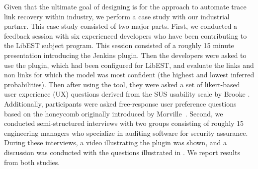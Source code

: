 Given that the ultimate goal of designing \Comet is for the approach to automate trace link recovery within industry, we perform a case study with our industrial partner. This case study consisted of two major parts.
First, we conducted a feedback session with six experienced developers who have been contributing to the LibEST subject program. This session consisted of a roughly 15 minute presentation introducing the \Comet Jenkins plugin. Then the developers were asked to use the plugin, which had been configured for LibEST, and evaluate the links and non links for which the model was most confident (\ie the highest and lowest inferred probabilities). Then after using the tool, they were asked a set of likert-based user experience (UX) questions derived from the SUS usability scale by Brooke \citep{Brooke:96}. Additionally, participants were asked free-response user preference questions based on the honeycomb originally introduced by Morville~\citep{Morville:04}. Second, we conducted semi-structured interviews with two groups consisting of roughly 15 engineering managers who specialize in auditing software for security assurance. During these interviews, a video illustrating the \Comet plugin was shown, and a discussion was conducted with the questions illustrated in . We report results from both studies.